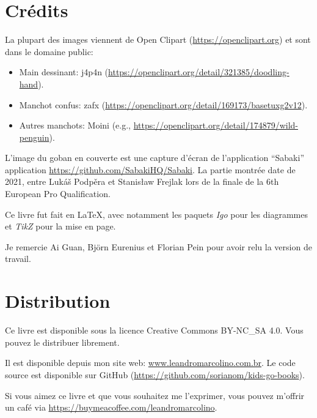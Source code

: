 \documentclass[a4paper,12pt]{extarticle}
\begin{document}
\newpage


\section*{Crédits}
La plupart des images viennent de Open Clipart (\url{https://openclipart.org}) et sont dans le domaine public:

\vspace{0.25cm}

\begin{itemize}
\item Main dessinant: j4p4n (\url{https://openclipart.org/detail/321385/doodling-hand}).
\item Manchot confus: zafx (\url{https://openclipart.org/detail/169173/basetuxg2v12}).
\item Autres manchots: Moini (e.g., \url{https://openclipart.org/detail/174879/wild-penguin}).
\end{itemize}

\vspace{0.25cm}

L'image du goban en couverte est une capture d'\'{e}cran de l'application ``Sabaki'' application \url{https://github.com/SabakiHQ/Sabaki}. La partie montr\'{e}e date de 2021, entre Lukáš Podpěra et Stanisław Frejlak lors de la finale de la 6th European Pro Qualification. 

Ce livre fut fait en \LaTeX, avec notamment les paquets \emph{Igo} pour les diagrammes et \emph{TikZ} pour la mise en page.

Je remercie Ai Guan, Björn Eurenius et Florian Pein pour avoir relu la version de travail.

\section*{Distribution}

Ce livre est disponible sous la licence Creative Commons BY-NC\_SA 4.0. Vous pouvez le distribuer librement.

Il est disponible depuis mon site web: \url{www.leandromarcolino.com.br}. Le code source est disponible sur GitHub (\url{https://github.com/sorianom/kids-go-books}).

Si vous aimez ce livre et que vous souhaitez me l'exprimer, vous pouvez m'offrir un caf\'{e} via \url{https://buymeacoffee.com/leandromarcolino}.
\end{document}
